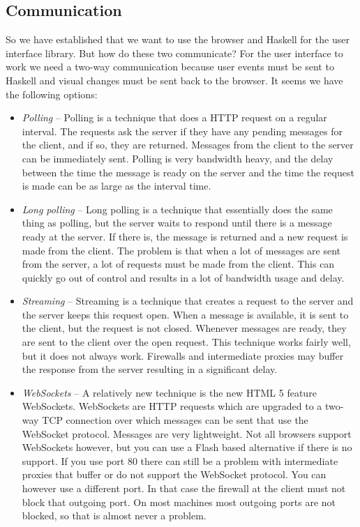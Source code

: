 \documentclass[11pt,a4paper]{article}
\begin{document}
\subsection{Communication}

So we have established that we want to use the browser and Haskell for the user interface library.
But how do these two communicate?
For the user interface to work we need a two-way communication because user events must be sent to Haskell and visual changes must be sent back to the browser.
It seems we have the following options:

\begin{itemize}
\item \textit{Polling} -- Polling is a technique that does a HTTP request on a regular interval.
The requests ask the server if they have any pending messages for the client, and if so, they are returned. Messages from the client to the server can be immediately sent.
Polling is very bandwidth heavy, and the delay between the time the message is ready on the server and the time the request is made can be as large as the interval time.
\item \textit{Long polling} -- Long polling is a technique that essentially does the same thing as polling, but the server waits to respond until there is a message ready at the server.
If there is, the message is returned and a new request is made from the client.
The problem is that when a lot of messages are sent from the server, a lot of requests must be made from the client.
This can quickly go out of control and results in a lot of bandwidth usage and delay.
\item \textit{Streaming} -- Streaming is a technique that creates a request to the server and the server keeps this request open.
When a message is available, it is sent to the client, but the request is not closed.
Whenever messages are ready, they are sent to the client over the open request.
This technique works fairly well, but it does not always work.
Firewalls and intermediate proxies may buffer the response from the server resulting in a significant delay.
\item \textit{WebSockets} -- A relatively new technique is the new HTML 5 feature WebSockets.
WebSockets are HTTP requests which are upgraded to a two-way TCP connection over which messages can be sent that use the WebSocket protocol.
Messages are very lightweight.
Not all browsers support WebSockets however, but you can use a Flash based alternative if there is no support.
If you use port 80 there can still be a problem with intermediate proxies that buffer or do not support the WebSocket protocol.
You can however use a different port.
In that case the firewall at the client must not block that outgoing port.
On most machines most outgoing ports are not blocked, so that is almost never a problem.
\end{itemize}
\end{document}
